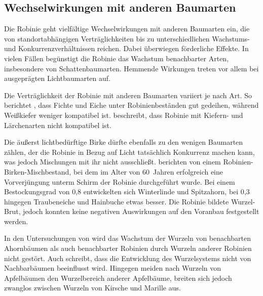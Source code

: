 \documentclass[twocolumn]{scrartcl}
\begin{document}
\subsection{Wechselwirkungen mit anderen Baumarten}

Die Robinie geht vielfältige Wechselwirkungen mit anderen Baumarten
ein, die von standortabhängigen Verträglichkeiten bis zu
unterschiedlichen Wachstums- und Konkurrenzverhältnissen
reichen. Dabei überwiegen förderliche Effekte. In vielen Fällen
begünstigt die Robinie das Wachstum benachbarter Arten, insbesondere
von Schattenbaumarten. Hemmende Wirkungen treten vor allem bei
ausgeprägten Lichtbaumarten auf.

Die Verträglichkeit der Robinie mit anderen Baumarten variiert je nach
Art. So berichtet \citet[S.~138]{krauss1986sauenerWald}, dass Fichte
und Eiche unter Robinienbeständen gut gedeihen, während Weißkiefer
weniger kompatibel ist. \citet{kellog1934robinieMischbestand}
beschreibt, dass Robinie mit Kiefern- und Lärchenarten nicht
kompatibel ist.

Die äußerst lichtbedürftige Birke dürfte ebenfalls zu den wenigen
Baumarten zählen, der die Robinie in Bezug auf Licht tatsächlich
Konkurrenz machen kann, was jedoch Mischungen mit ihr nicht
ausschließt. \citet{gaier2009robinieVorverjuengung} berichten von
einem Robinien-Birken-Mischbestand, bei dem im Alter von 60~Jahren
erfolgreich eine Vorverjüngung unterm Schirm der Robinie durchgeführt
wurde. Bei einem Bestockungsgrad von 0{,}8 entwickelten sich
Winterlinde und Spitzahorn, bei 0{,}3 hingegen Traubeneiche und
Hainbuche etwas besser. Die Robinie bildete Wurzel-Brut, jedoch
konnten keine negativen Auswirkungen auf den Voranbau festgestellt
werden.

In den Untersuchungen von
\citet[S.~150--160]{scamoni1952robinieWurzeln} wird das Wachstum der
Wurzeln von benachbarten Ahornbäumen als auch benachbarter Robinien
durch Wurzeln anderer Robinien nicht gestört. Auch
\citet{bencat1992robinie} schreibt, dass die Entwicklung des
Wurzelsystems nicht von Nachbarbäumen beeinflusst wird. Hingegen
meiden nach \citet[S.~53]{kolesnikov1971wurzeln} Wurzeln von
Apfelbäumen den Wurzelbereich anderer Apfelbäume, breiten sich jedoch
zwanglos zwischen Wurzeln von Kirsche und Marille aus.
\end{document}
